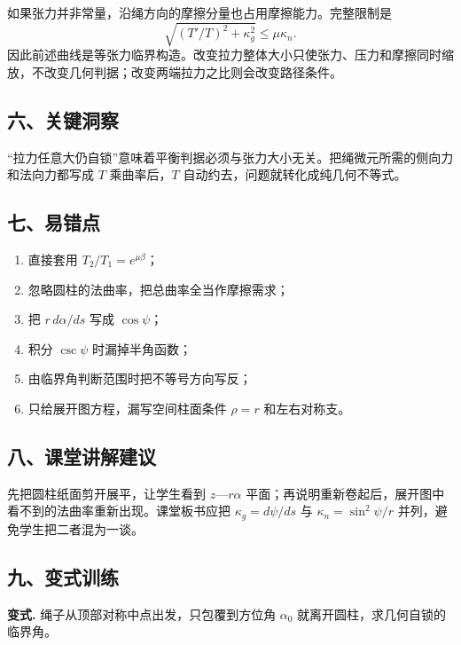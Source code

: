 \documentclass[12pt,a4paper,UTF8]{ctexart}
\newcommand{\tightlist}{\setlength{\itemsep}{0pt}\setlength{\parskip}{0pt}}
\begin{document}
如果张力并非常量，沿绳方向的摩擦分量也占用摩擦能力。完整限制是 \[
\sqrt{(T'/T)^2+\kappa_g^2}\le\mu\kappa_n.
\]
因此前述曲线是等张力临界构造。改变拉力整体大小只使张力、压力和摩擦同时缩放，不改变几何判据；改变两端拉力之比则会改变路径条件。

\subsection{六、关键洞察}\label{ux516dux5173ux952eux6d1eux5bdf-2}

``拉力任意大仍自锁''意味着平衡判据必须与张力大小无关。把绳微元所需的侧向力和法向力都写成
\(T\) 乘曲率后，\(T\) 自动约去，问题就转化成纯几何不等式。

\subsection{七、易错点}\label{ux4e03ux6613ux9519ux70b9-2}

\begin{enumerate}
\def\labelenumi{\arabic{enumi}.}
\tightlist
\item
  直接套用 \(T_2/T_1=e^{\mu\beta}\)；
\item
  忽略圆柱的法曲率，把总曲率全当作摩擦需求；
\item
  把 \(r\,d\alpha/ds\) 写成 \(\cos\psi\)；
\item
  积分 \(\csc\psi\) 时漏掉半角函数；
\item
  由临界角判断范围时把不等号方向写反；
\item
  只给展开图方程，漏写空间柱面条件 \(\rho=r\) 和左右对称支。
\end{enumerate}

\subsection{八、课堂讲解建议}\label{ux516bux8bfeux5802ux8bb2ux89e3ux5efaux8bae-2}

先把圆柱纸面剪开展平，让学生看到 \(z\)---\(r\alpha\)
平面；再说明重新卷起后，展开图中看不到的法曲率重新出现。课堂板书应把
\(\kappa_g=d\psi/ds\) 与 \(\kappa_n=\sin^2\psi/r\)
并列，避免学生把二者混为一谈。

\subsection{九、变式训练}\label{ux4e5dux53d8ux5f0fux8badux7ec3-2}

\textbf{变式.} 绳子从顶部对称中点出发，只包覆到方位角 \(\alpha_0\)
就离开圆柱，求几何自锁的临界角。
\end{document}
